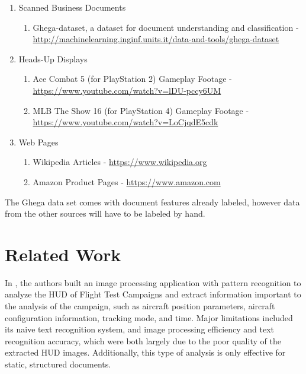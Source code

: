 \documentclass[twoside,11pt]{article}
\renewcommand{\>}{{\rightarrow}}
\newcommand{\1}{{\mathbf 1}}
\newcommand{\0}{{\mathbf 0}}
\begin{document}
\begin{enumerate}
    \item
    Scanned Business Documents
    \begin{enumerate}
        \item
        \sloppy
        Ghega-dataset, a dataset for document understanding and classification - \url{http://machinelearning.inginf.units.it/data-and-tools/ghega-dataset}
    \end{enumerate}

    \item
    Heads-Up Displays
    \begin{enumerate}
        \item
        Ace Combat 5 (for PlayStation 2) Gameplay Footage - \url{https://www.youtube.com/watch?v=lDU-pccy6UM}

        \item
        MLB The Show 16 (for PlayStation 4) Gameplay Footage - \url{https://www.youtube.com/watch?v=LoCjqdE5cdk}
    \end{enumerate}

    \item
    Web Pages
    \begin{enumerate}
        \item
        Wikipedia Articles - \url{https://www.wikipedia.org}

        \item
        Amazon Product Pages - \url{https://www.amazon.com}

    \end{enumerate}
\end{enumerate}

The Ghega data set comes with document features already labeled, however data from the other sources will have to be labeled by hand.



\section{Related Work}

In \cite{Guarino2013}, the authors built an image processing application with pattern recognition to analyze the HUD of Flight Test Campaigns and extract information important to the analysis of the campaign, such as aircraft position parameters, aircraft configuration information, tracking mode, and time. Major limitations included its naive text recognition system, and image processing efficiency and text recognition accuracy, which were both largely due to the poor quality of the extracted HUD images. Additionally, this type of analysis is only effective for static, structured documents.
\end{document}
